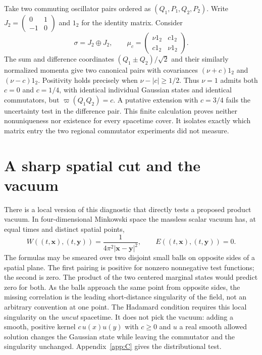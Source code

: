 Take two commuting oscillator pairs ordered as $(Q_1,P_1,Q_2,P_2)$.
Write $J_2=\left(\begin{smallmatrix}0&1\\-1&0\end{smallmatrix}\right)$
and $1_2$ for the identity matrix. Consider
\[
 \sigma=J_2\oplus J_2,\qquad
 \mu_c=\begin{pmatrix}\nu 1_2&c1_2\\c1_2&\nu 1_2\end{pmatrix}.
\]
The sum and difference coordinates $(Q_1\pm Q_2)/\sqrt2$ and their
similarly normalized momenta give two canonical pairs with covariances
$(\nu+c)1_2$ and $(\nu-c)1_2$. Positivity holds precisely when
$\nu-|c|\ge1/2$. Thus $\nu=1$ admits both $c=0$ and $c=1/4$, with
identical individual Gaussian states and identical commutators, but
$\varpi(Q_1Q_2)=c$. A putative extension with $c=3/4$ fails the uncertainty
test in the difference pair. This finite calculation proves neither
nonuniqueness nor existence for every spacetime cover. It isolates exactly
which matrix entry the two regional commutator experiments did not measure.

\section{A sharp spatial cut and the vacuum}
There is a local version of this diagnostic that directly tests a proposed
product vacuum. In four-dimensional Minkowski space the massless scalar
vacuum has, at equal times and distinct spatial points,
\[
 W((t,\mathbf x),(t,\mathbf y))=
 \frac{1}{4\pi^2|\mathbf x-\mathbf y|^2},\qquad
 E((t,\mathbf x),(t,\mathbf y))=0 .
\]
The formulas may be smeared over two disjoint small balls on opposite
sides of a spatial plane. The first pairing is positive for nonzero
nonnegative test functions; the second is zero. The product of the two
centered marginal states would predict zero for both. As the balls approach
the same point from opposite sides, the missing correlation is the leading
short-distance singularity of the field, not an arbitrary convention at
one point. The Hadamard condition requires this local singularity on the
\emph{uncut} spacetime. It does not pick the vacuum: adding a smooth,
positive kernel $c\,u(x)u(y)$ with $c\ge0$ and $u$ a real smooth allowed
solution changes the Gaussian state while leaving the commutator and the
singularity unchanged. Appendix~\ref{app:C} gives the distributional test.

